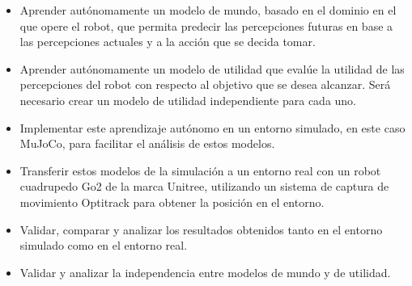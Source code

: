 \begin{itemize}
  \item Aprender autónomamente un modelo de mundo, basado en el dominio en el que opere el robot, que permita predecir 
  las percepciones futuras en base a las percepciones actuales y a la acción que se decida tomar.
  \item Aprender autónomamente un modelo de utilidad que evalúe la utilidad de las percepciones del robot con respecto 
  al objetivo que se desea alcanzar. Será necesario crear un modelo de utilidad independiente para cada uno.
  \item Implementar este aprendizaje autónomo en un entorno simulado, en este caso MuJoCo\cite{MujocoWeb}, para facilitar 
  el análisis de estos modelos.
  \item Transferir estos modelos de la simulación a un entorno real con un robot cuadrupedo Go2 de 
  la marca Unitree\cite{UnitreeWeb}, utilizando un sistema de captura de movimiento Optitrack\cite{OptitrackWeb} para 
  obtener la posición en el entorno.
  \item Validar, comparar y analizar los resultados obtenidos tanto en el entorno simulado como en el entorno real.
  \item Validar y analizar la independencia entre modelos de mundo y de utilidad.
\end{itemize}



